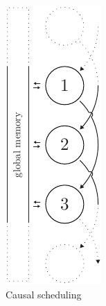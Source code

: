 \begin{figure}[h!]
\begin{minipage}[t]{0.20\textwidth}
    \vfill
    \caption{Causal scheduling}
    \label{fig:causal-scheduling}
  \end{minipage}
  \hfill
  \vrule
  \hfill
  \begin{minipage}[t]{0.20\textwidth}
    \centering
    \includegraphics[page=3, height=2\linewidth]{../resources/invariance.pdf}

\end{minipage}
\end{figure}
